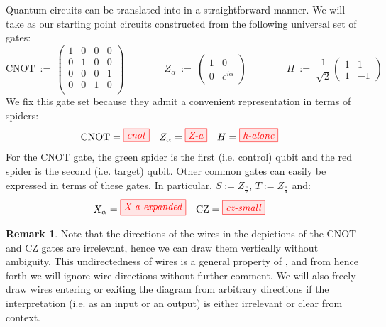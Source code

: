 \documentclass[a4paper,onecolumn,superscriptaddress,11pt,accepted=2020-04-27]{quantumarticle}
\newcommand{\CZ}{\ensuremath{\textrm{CZ}}\xspace}
\newcommand{\CX}{\ensuremath{\textrm{CNOT}}\xspace}
\newcommand{\CNOT}{\CX}
\theoremstyle{definition}
\newtheorem{example}[theorem]{Example}
\newtheorem{remark}[theorem]{Remark}
\begin{document}
Quantum circuits can be translated into \zxdiagrams in a straightforward manner. 
We will take as our starting point circuits constructed
from the following universal set of gates:
\[
\CNOT \ :=\
\left(\begin{matrix}
  1 & 0 & 0 & 0 \\
  0 & 1 & 0 & 0 \\
  0 & 0 & 0 & 1 \\
  0 & 0 & 1 & 0 \\
\end{matrix}\right)
\qquad\qquad
Z_\alpha \ :=\
\left(\begin{matrix}
  1 & 0 \\
  0 & e^{i \alpha}
\end{matrix}\right)
\qquad\qquad
H \ :=\ \frac{1}{\sqrt{2}}
\left(\begin{matrix}
  1 & 1 \\
  1 & -1
\end{matrix}\right)
\]
We fix this gate
set because they admit a convenient representation in terms of
spiders: 
\begin{align}\label{eq:zx-gates}
\CNOT & = \tikzfig{cnot} &
Z_\alpha & = \tikzfig{Z-a} &
H & = \tikzfig{h-alone}
\end{align}
For the \CNOT gate, the green spider is the first (i.e. control) qubit and the red spider is the second (i.e. target) qubit. Other common gates can easily be expressed in terms of these gates. In particular, $S := Z_{\frac\pi2}$, $T := Z_{\frac\pi4}$ and:
\begin{align*}
X_\alpha & = \tikzfig{X-a-expanded} &
\CZ & = \tikzfig{cz-small}
\end{align*}

\begin{remark}
  Note that the directions of the wires in the depictions of the \CNOT and \CZ gates are irrelevant, hence we can draw them vertically without ambiguity. This undirectedness of wires is a general property of \zxdiagrams, and from hence forth we will ignore wire directions without further comment. We will also freely draw wires entering or exiting the diagram from arbitrary directions if the interpretation (i.e. as an input or an output) is either irrelevant or clear from context. %
\end{remark}


\end{document}
